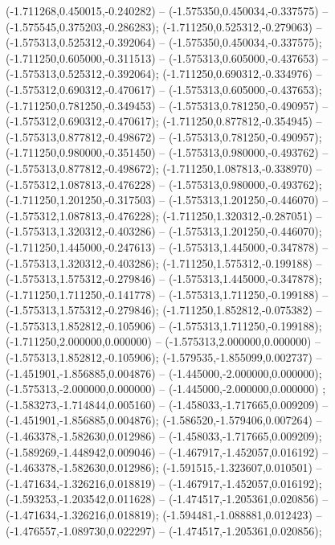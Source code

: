  (-1.711268,0.450015,-0.240282) -- (-1.575350,0.450034,-0.337575) -- (-1.575545,0.375203,-0.286283);
 (-1.711250,0.525312,-0.279063) -- (-1.575313,0.525312,-0.392064) -- (-1.575350,0.450034,-0.337575);
 (-1.711250,0.605000,-0.311513) -- (-1.575313,0.605000,-0.437653) -- (-1.575313,0.525312,-0.392064);
 (-1.711250,0.690312,-0.334976) -- (-1.575312,0.690312,-0.470617) -- (-1.575313,0.605000,-0.437653);
 (-1.711250,0.781250,-0.349453) -- (-1.575313,0.781250,-0.490957) -- (-1.575312,0.690312,-0.470617);
 (-1.711250,0.877812,-0.354945) -- (-1.575313,0.877812,-0.498672) -- (-1.575313,0.781250,-0.490957);
 (-1.711250,0.980000,-0.351450) -- (-1.575313,0.980000,-0.493762) -- (-1.575313,0.877812,-0.498672);
 (-1.711250,1.087813,-0.338970) -- (-1.575312,1.087813,-0.476228) -- (-1.575313,0.980000,-0.493762);
 (-1.711250,1.201250,-0.317503) -- (-1.575313,1.201250,-0.446070) -- (-1.575312,1.087813,-0.476228);
 (-1.711250,1.320312,-0.287051) -- (-1.575313,1.320312,-0.403286) -- (-1.575313,1.201250,-0.446070);
 (-1.711250,1.445000,-0.247613) -- (-1.575313,1.445000,-0.347878) -- (-1.575313,1.320312,-0.403286);
 (-1.711250,1.575312,-0.199188) -- (-1.575313,1.575312,-0.279846) -- (-1.575313,1.445000,-0.347878);
 (-1.711250,1.711250,-0.141778) -- (-1.575313,1.711250,-0.199188) -- (-1.575313,1.575312,-0.279846);
 (-1.711250,1.852812,-0.075382) -- (-1.575313,1.852812,-0.105906) -- (-1.575313,1.711250,-0.199188);
 (-1.711250,2.000000,0.000000) -- (-1.575313,2.000000,0.000000) -- (-1.575313,1.852812,-0.105906);
 (-1.579535,-1.855099,0.002737) -- (-1.451901,-1.856885,0.004876) -- (-1.445000,-2.000000,0.000000);
 (-1.575313,-2.000000,0.000000) -- (-1.445000,-2.000000,0.000000) ;
 (-1.583273,-1.714844,0.005160) -- (-1.458033,-1.717665,0.009209) -- (-1.451901,-1.856885,0.004876);
 (-1.586520,-1.579406,0.007264) -- (-1.463378,-1.582630,0.012986) -- (-1.458033,-1.717665,0.009209);
 (-1.589269,-1.448942,0.009046) -- (-1.467917,-1.452057,0.016192) -- (-1.463378,-1.582630,0.012986);
 (-1.591515,-1.323607,0.010501) -- (-1.471634,-1.326216,0.018819) -- (-1.467917,-1.452057,0.016192);
 (-1.593253,-1.203542,0.011628) -- (-1.474517,-1.205361,0.020856) -- (-1.471634,-1.326216,0.018819);
 (-1.594481,-1.088881,0.012423) -- (-1.476557,-1.089730,0.022297) -- (-1.474517,-1.205361,0.020856);

